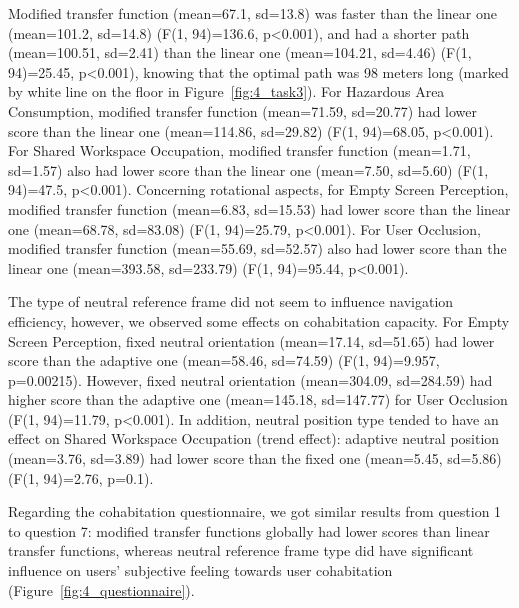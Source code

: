 Modified transfer function (mean=67.1, sd=13.8) was faster than the linear one (mean=101.2, sd=14.8) (F(1, 94)=136.6, p\textless 0.001), and had a shorter path (mean=100.51, sd=2.41) than the linear one (mean=104.21, sd=4.46) (F(1, 94)=25.45, p\textless 0.001), knowing that the optimal path was 98 meters long (marked by white line on the floor in Figure~\ref{fig:4_task3}). For Hazardous Area Consumption, modified transfer function (mean=71.59, sd=20.77) had lower score than the linear one (mean=114.86, sd=29.82) (F(1, 94)=68.05, p\textless 0.001). For Shared Workspace Occupation, modified transfer function (mean=1.71, sd=1.57) also had lower score than the linear one (mean=7.50, sd=5.60) (F(1, 94)=47.5, p\textless 0.001). Concerning rotational aspects, for Empty Screen Perception, modified transfer function (mean=6.83, sd=15.53) had lower score than the linear one (mean=68.78, sd=83.08) (F(1, 94)=25.79, p\textless 0.001). For User Occlusion, modified transfer function (mean=55.69, sd=52.57) also had lower score than the linear one (mean=393.58, sd=233.79) (F(1, 94)=95.44, p\textless 0.001).

The type of neutral reference frame did not seem to influence navigation efficiency, however, we observed some effects on cohabitation capacity. For Empty Screen Perception, fixed neutral orientation (mean=17.14, sd=51.65) had lower score than the adaptive one (mean=58.46, sd=74.59) (F(1, 94)=9.957, p=0.00215). However, fixed neutral orientation (mean=304.09, sd=284.59) had higher score than the adaptive one (mean=145.18, sd=147.77) for User Occlusion (F(1, 94)=11.79, p\textless 0.001). In addition, neutral position type tended to have an effect on Shared Workspace Occupation (trend effect): adaptive neutral position (mean=3.76, sd=3.89) had lower score than the fixed one (mean=5.45, sd=5.86) (F(1, 94)=2.76, p=0.1).

Regarding the cohabitation questionnaire, we got similar results from question 1 to question 7: modified transfer functions globally had lower scores than linear transfer functions, whereas neutral reference frame type did have significant influence on users' subjective feeling towards user cohabitation (Figure~\ref{fig:4_questionnaire}).

